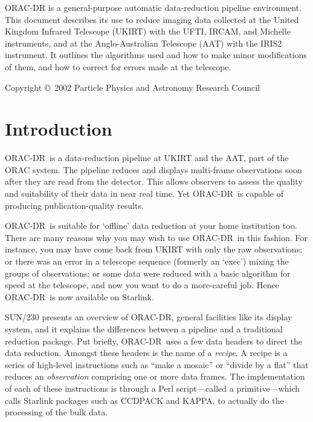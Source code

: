 \documentclass[twoside,11pt]{article}
\newcommand{\stardocinitials}  {SUN}
\newcommand{\stardocnumber}    {232.6}
\newcommand{\stardoccopyright} {Copyright \copyright\ 2002 Particle Physics and Astronomy Research Council}
\newcommand{\stardocabstract}  {{\footnotesize ORAC-DR} is a
general-purpose automatic data-reduction pipeline environment.  This
document describes its use to reduce imaging data collected at the
United Kingdom Infrared Telescope (UKIRT) with the UFTI, IRCAM, and
Michelle instruments, and at the Anglo-Australian Telescope (AAT) with
the IRIS2 instrument.  It outlines the algorithms used and how to make
minor modifications of them, and how to correct for errors made at the
telescope.}
\newcommand{\stardocname}{\stardocinitials /\stardocnumber}
\newcommand{\htmladdnormallink}[2]{#1}
\newenvironment{latexonly}{}{}
\newcommand{\xref}[3]{#1}
\newcommand{\xlabel}[1]{}
\renewcommand{\_}{\texttt{\symbol{95}}}
\newcommand{\CCDPACK}{{\footnotesize CCDPACK}}
\newcommand{\KAPPA}{{\footnotesize KAPPA}}
\newcommand{\ORACDR}{{\footnotesize ORAC-DR}}
\renewcommand{\thepage}{\roman{page}}
\begin{document}
\stardocabstract

\begin{latexonly}
\newpage
\vspace*{\fill}
\stardoccopyright
\end{latexonly}

  \newpage
  \begin{latexonly}
    \setlength{\parskip}{0mm}
    \tableofcontents
    \setlength{\parskip}{\medskipamount}
    \markboth{\stardocname}{\stardocname}
  \end{latexonly}
\cleardoublepage
\renewcommand{\thepage}{\arabic{page}}
\setcounter{page}{1}

\section{\xlabel{introduction}Introduction\label{introduction}}

\ORACDR\ is a data-reduction pipeline at UKIRT and the AAT, part of the
\htmladdnormallink{ORAC system}{http://www.stsci.edu/stsci/meetings/adassVII/bridgera.html}.
The pipeline reduces and displays multi-frame
observations soon after they are read from the detector.  This allows
observers to assess the quality and suitability of their data in near
real time.  Yet \ORACDR\ is capable of producing publication-quality
results.  

\ORACDR\ is suitable for `offline' data reduction at your home
institution too.  There are many reasons why you may wish to use
\ORACDR\ in this fashion.  For instance, you may have come back from
UKIRT with only the raw observations; or there was an error in a
telescope sequence (formerly an `exec') mixing the groups of
observations; or some data were reduced with a basic algorithm for
speed at the telescope, and now you want to do a more-careful job.
Hence \ORACDR\ is now available on Starlink.

\xref{SUN/230}{sun230}{} presents an overview of \ORACDR,
general facilities like its display system, and it explains the
differences between a pipeline and a traditional reduction package.
Put briefly, \ORACDR\ uses a few data headers to direct the data
reduction.  Amongst these headers is the name of a {\em recipe}.  A
recipe is a series of high-level instructions such as ``make a
mosaic'' or ``divide by a flat'' that reduces an {\em observation\/}
comprising one or more data frames.  The implementation of each of
these instructions is through a Perl script---called a
primitive---which calls Starlink packages such as
\xref{\CCDPACK}{sun139}{} and \xref{\KAPPA}{sun95}{},
to actually do the processing of the bulk data.
\end{document}
